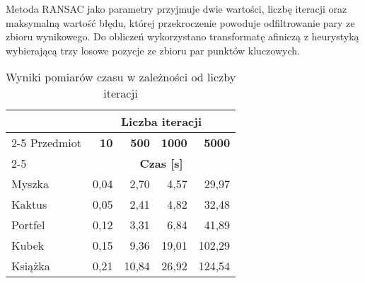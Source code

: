 \documentclass[../main.tex]{subfiles}
\begin{document}
   Metoda RANSAC jako parametry przyjmuje dwie wartości, liczbę iteracji oraz maksymalną wartość błędu, której przekroczenie powoduje odfiltrowanie pary ze zbioru wynikowego. Do obliczeń wykorzystano transformatę afiniczą z heurystyką wybierającą trzy losowe pozycje ze zbioru par punktów kluczowych.
    
    \begin{table}[H]
    \caption{Wyniki pomiarów czasu w zależności od liczby iteracji}
     \label{t:iterations}
     \begin{center}
        \begin{tabular}{|l|r|r|r|r|}
            \hline
            \multirow{2}{*}{{}} &
            \multicolumn{4}{c|}{\textbf{Liczba iteracji}} \\
            
            \cline{2-5}
            {Przedmiot} & \textbf{10} & \textbf{500} & \textbf{1000} & \textbf{5000} \\
            \cline{2-5}
            {} & \multicolumn{4}{c|}{\textbf{Czas [s]}} \\
            
             \hline
             {Myszka} & {0,04} & {2,70} & {4,57} & {29,97}  \\
             \hline 
             {Kaktus} & {0,05} & {2,41} & {4,82} & {32,48} \\
             \hline
             {Portfel} & {0,12} & {3,31} & {6,84} & {41,89}  \\
            \hline
             {Kubek} & {0,15} & {9,36} & {19,01} & {102,29} \\
             \hline
             {Książka} & {0,21} & {10,84} & {26,92} & {124,54}  \\
            \hline
            
        \end{tabular}
     \end{center}
    \end{table}
\end{document}
